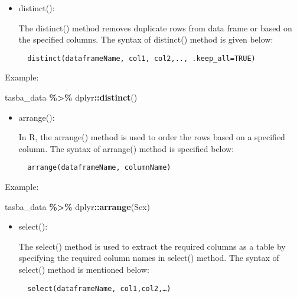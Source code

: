 \documentclass[
]{book}
\newenvironment{Shaded}{\begin{snugshade}}{\end{snugshade}}
\newcommand{\FunctionTok}[1]{\textcolor[rgb]{0.13,0.29,0.53}{\textbf{#1}}}
\newcommand{\NormalTok}[1]{#1}
\newcommand{\SpecialCharTok}[1]{\textcolor[rgb]{0.81,0.36,0.00}{\textbf{#1}}}
\begin{document}
\begin{itemize}
\item
  distinct():

  The distinct() method removes duplicate rows from data frame or based on the specified columns. The syntax of distinct() method is given below:

\begin{verbatim}
  distinct(dataframeName, col1, col2,.., .keep_all=TRUE)
\end{verbatim}
\end{itemize}

Example:

\begin{Shaded}
\begin{Highlighting}[]
\NormalTok{tasba\_data }\SpecialCharTok{\%\textgreater{}\%} 
\NormalTok{  dplyr}\SpecialCharTok{::}\FunctionTok{distinct}\NormalTok{()}
\end{Highlighting}
\end{Shaded}

\begin{itemize}
\item
  arrange():

  In R, the arrange() method is used to order the rows based on a specified column. The syntax of arrange() method is specified below:

\begin{verbatim}
  arrange(dataframeName, columnName)
\end{verbatim}
\end{itemize}

Example:

\begin{Shaded}
\begin{Highlighting}[]
\NormalTok{tasba\_data }\SpecialCharTok{\%\textgreater{}\%} 
\NormalTok{  dplyr}\SpecialCharTok{::}\FunctionTok{arrange}\NormalTok{(Sex)}
\end{Highlighting}
\end{Shaded}

\begin{itemize}
\item
  select():

  The select() method is used to extract the required columns as a table by specifying the required column names in select() method. The syntax of select() method is mentioned below:

\begin{verbatim}
  select(dataframeName, col1,col2,…)
\end{verbatim}
\end{itemize}
\end{document}

